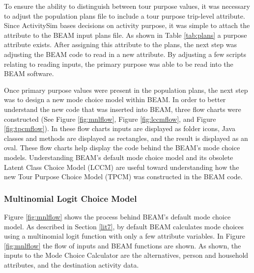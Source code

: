 \documentclass[12pt, oneside, openright]{byuthesis}
\begin{document}
To ensure the ability to distinguish between tour purpose values, it was necessary to adjust the population plans file to include a tour purpose trip-level attribute. Since ActivitySim bases decisions on activity purpose, it was simple to attach the attribute to the BEAM input plans file. As shown in Table \ref{tab:plans} a purpose attribute exists. After assigning this attribute to the plans, the next step was adjusting the BEAM code to read in a new attribute. By adjusting a few scripts relating to reading inputs, the primary purpose was able to be read into the BEAM software.

Once primary purpose values were present in the population plans, the next step was to design a new mode choice model within BEAM. In order to better understand the new code that was inserted into BEAM, three flow charts were constructed (See Figure \ref{fig:mnlflow}, Figure \ref{fig:lccmflow}, and Figure \ref{fig:tpcmflow}). In these flow charts inputs are displayed as folder icons, Java classes and methods are displayed as rectangles, and the result is displayed as an oval. These flow charts help display the code behind the BEAM's mode choice models. Understanding BEAM's default mode choice model and its obsolete Latent Class Choice Model (LCCM) are useful toward understanding how the new Tour Purpose Choice Model (TPCM) was constructed in the BEAM code.

\hypertarget{multinomial-logit-choice-model}{%
\subsubsection{Multinomial Logit Choice Model}\label{multinomial-logit-choice-model}}

Figure \ref{fig:mnlflow} shows the process behind BEAM's default mode choice model. As described in Section \ref{lit7}, by default BEAM calculates mode choices using a multinomial logit function with only a few attribute variables. In Figure \ref{fig:mnlflow} the flow of inputs and BEAM functions are shown. As shown, the inputs to the Mode Choice Calculator are the alternatives, person and household attributes, and the destination activity data.
\end{document}
